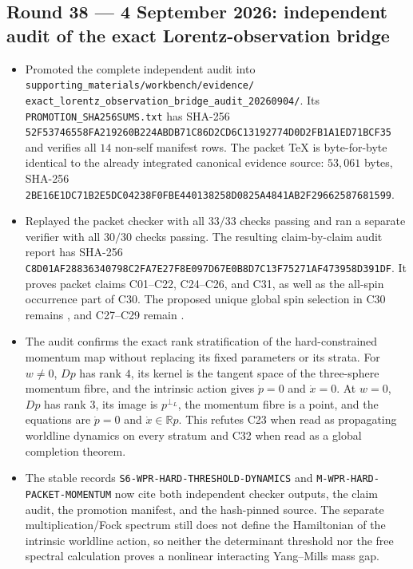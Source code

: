 \subsection*{Round 38 --- 4 September 2026: independent audit of the exact
Lorentz-observation bridge}

\begin{itemize}
\item Promoted the complete independent audit into
\texttt{supporting\_materials/workbench/evidence/
exact\_lorentz\_observation\_bridge\_audit\_20260904/}.  Its
\texttt{PROMOTION\_SHA256SUMS.txt} has SHA-256
\texttt{52F53746558FA219260B224ABDB71C86D2CD6C13192774D0D2FB1A1ED71BCF35}
and verifies all \(14\) non-self manifest rows.  The packet TeX is byte-for-byte
identical to the already integrated canonical evidence source: \(53{,}061\)
bytes, SHA-256
\texttt{2BE16E1DC71B2E5DC04238F0FBE440138258D0825A4841AB2F29662587681599}.

\item Replayed the packet checker with all \(33/33\) checks passing and ran a
separate verifier with all \(30/30\) checks passing.  The resulting
claim-by-claim audit report has SHA-256
\texttt{C8D01AF28836340798C2FA7E27F8E097D67E0B8D7C13F75271AF473958D391DF}.
It proves packet claims C01--C22, C24--C26, and C31, as well as the
all-spin occurrence part of C30.  The proposed unique global spin selection
in C30 remains \Open, and C27--C29 remain \Open.

\item The audit confirms the exact rank stratification of the hard-constrained
momentum map without replacing its fixed parameters or its strata.  For
\(w\neq0\), \(Dp\) has rank \(4\), its kernel is the tangent space of the
three-sphere momentum fibre, and the intrinsic action gives
\(\dot p=0\) and \(\dot x=0\).  At \(w=0\), \(Dp\) has rank \(3\), its
image is \(p^{\perp_L}\), the momentum fibre is a point, and the equations are
\(\dot p=0\) and \(\dot x\in\mathbb Rp\).  This refutes C23 when read as
propagating worldline dynamics on every stratum and C32 when read as a global
completion theorem.

\item The stable records
\texttt{S6-WPR-HARD-THRESHOLD-DYNAMICS} and
\texttt{M-WPR-HARD-PACKET-MOMENTUM} now cite both independent checker outputs,
the claim audit, the promotion manifest, and the hash-pinned source.  The
separate multiplication/Fock spectrum still does not define the Hamiltonian
of the intrinsic worldline action, so neither the determinant threshold nor
the free spectral calculation proves a nonlinear interacting Yang--Mills
mass gap.
\end{itemize}

